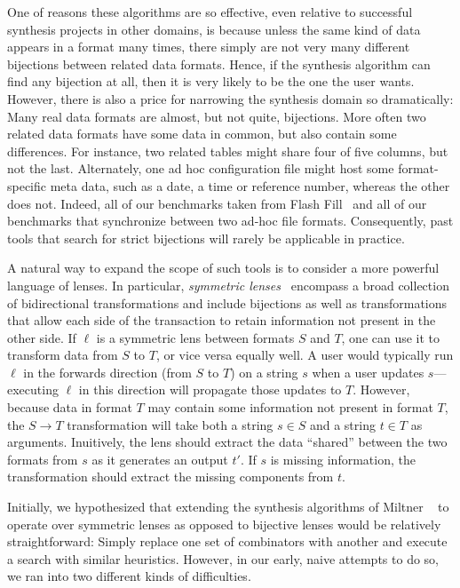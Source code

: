 \documentclass[acmsmall,screen,anonymous]{acmart}
\begin{document}
One of reasons these algorithms are so effective, even relative to successful
synthesis projects in other domains, is because unless the same kind of data
appears in a format many times, there simply are not very many different
bijections between related data formats. Hence, if the synthesis algorithm can
find any bijection at all, then it is very likely to be the one the user wants.
However, there is also a price for narrowing the synthesis domain so
dramatically: Many real data formats are almost, but not quite, bijections. More
often two related data formats have some data in common, but also contain some
differences. For instance, two related tables might share four of five columns,
but not the last. Alternately, one ad hoc configuration file might host some
format-specific meta data, such as a date, a time or reference number, whereas
the other does not. Indeed, all of our benchmarks taken from Flash
Fill~\cite{flashfill} and all of our benchmarks that synchronize between two
ad-hoc file formats. Consequently, past tools that search for strict bijections
will rarely be applicable in practice.

A natural way to expand the scope of such tools is to consider a more
powerful language of lenses.  In particular, \emph{symmetric
lenses}~\cite{symmetric-lenses} encompass a broad collection of bidirectional
transformations and include bijections as well as transformations that
allow each side of the transaction to retain information not present
in the other side.  If $\ell$ is a symmetric lens between formats $S$ and $T$, one can
use it to transform data from $S$ to $T$, or vice versa equally well.  A user would typically
run $\ell$ in the forwards direction (from $S$ to $T$) on a string $s$ when a user updates
$s$---executing $\ell$ in this direction will propagate those updates to $T$.
However, because data in format $T$ may contain some information not present in format $T$,
the $S \rightarrow T$ transformation will take
both a string $s \in S$ and a string $t \in T$ as arguments.
Inuitively, the lens should extract the data ``shared'' between the two formats from $s$
as it generates an output $t'$.  If $s$ is missing information, the transformation should
extract the missing components from $t$.

Initially, we hypothesized that extending the synthesis algorithms
of Miltner \ETAL~\cite{miltner+:bijective-synthesis} to operate over symmetric lenses
as opposed to bijective lenses 
would be relatively straightforward:  Simply replace one set of combinators with another
and execute a search with similar heuristics.  However, in our early,
naive attempts to do so, we ran
into two different kinds of difficulties. 
\end{document}
